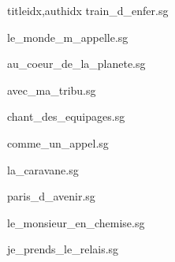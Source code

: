 \documentclass[
    fontsize=7pt
    ]{scrartcl}
\begin{document}
\begin{songs}{titleidx,authidx}
{train_d_enfer.sg}


{le_monde_m_appelle.sg}


{au_coeur_de_la_planete.sg}


{avec_ma_tribu.sg}


{chant_des_equipages.sg}


{comme_un_appel.sg}


{la_caravane.sg}


{paris_d_avenir.sg}


{le_monsieur_en_chemise.sg}


{je_prends_le_relais.sg}


\end{songs}
\end{document}
